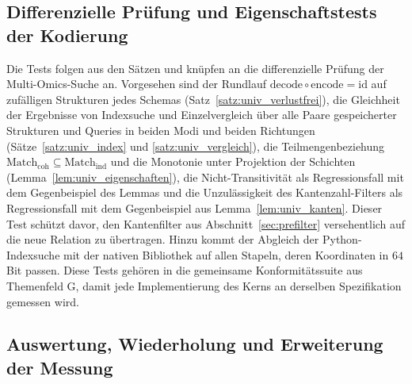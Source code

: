 \documentclass[a4paper,12pt, twoside]{report}
\theoremstyle{definition}
\begin{document}
\subsection{Differenzielle Prüfung und Eigenschaftstests der Kodierung}
\label{sec:ausb_univ_tests}

Die Tests folgen aus den Sätzen und knüpfen an die differenzielle Prüfung der Multi-Omics-Suche an. Vorgesehen sind der Rundlauf $\mathrm{decode}\circ\mathrm{encode}=\mathrm{id}$ auf zufälligen Strukturen jedes Schemas (Satz~\ref{satz:univ_verlustfrei}), die Gleichheit der Ergebnisse von Indexsuche und Einzelvergleich über alle Paare gespeicherter Strukturen und Queries in beiden Modi und beiden Richtungen (Sätze~\ref{satz:univ_index} und \ref{satz:univ_vergleich}), die Teilmengenbeziehung $\mathrm{Match}_{\mathrm{coh}}\subseteq\mathrm{Match}_{\mathrm{ind}}$ und die Monotonie unter Projektion der Schichten (Lemma~\ref{lem:univ_eigenschaften}), die Nicht-Transitivität als Regressionsfall mit dem Gegenbeispiel des Lemmas und die Unzulässigkeit des Kantenzahl-Filters als Regressionsfall mit dem Gegenbeispiel aus Lemma~\ref{lem:univ_kanten}. Dieser Test schützt davor, den Kantenfilter aus Abschnitt~\ref{sec:prefilter} versehentlich auf die neue Relation zu übertragen. Hinzu kommt der Abgleich der Python-Indexsuche mit der nativen Bibliothek auf allen Stapeln, deren Koordinaten in $64$ Bit passen. Diese Tests gehören in die gemeinsame Konformitätssuite aus Themenfeld G, damit jede Implementierung des Kerns an derselben Spezifikation gemessen wird.

\subsection{Auswertung, Wiederholung und Erweiterung der Messung}
\label{sec:ausb_univ_messung}
\end{document}
